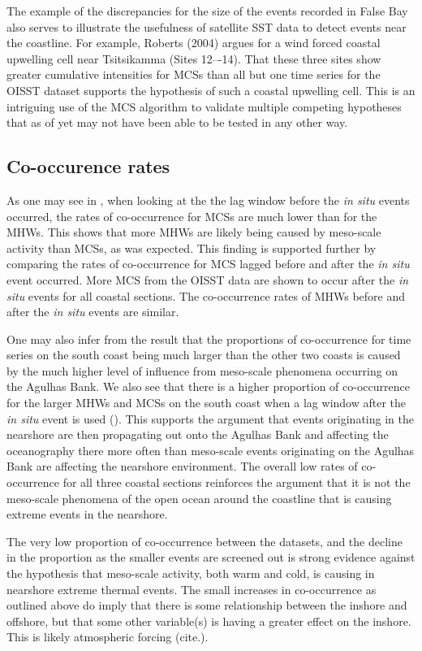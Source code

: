 \documentclass[a4paper,10pt,review]{elsarticle}
\begin{document}
The example of the discrepancies for the size of the events recorded in False Bay also serves to illustrate the usefulness of satellite SST data to detect events near the coastline. For example, Roberts (2004) argues for a wind forced coastal upwelling cell near Tsitsikamma (Sites 12–-14). That these three sites show greater cumulative intensities for MCSs than all but one time series for the OISST dataset supports the hypothesis of such a coastal upwelling cell. This is an intriguing use of the MCS algorithm to validate multiple competing hypotheses that as of yet may not have been able to be tested in any other way. 

\subsection{Co-occurence rates}
As one may see in , when looking at the the lag window before the \emph{in situ} events occurred, the rates of co-occurrence for MCSs are much lower than for the MHWs. This shows that more MHWs are likely being caused by meso-scale activity than MCSs, as was expected. This finding is supported further by comparing the rates of co-occurrence for MCS lagged before and after the \emph{in situ} event occurred. More MCS from the OISST data are shown to occur after the \emph{in situ} events for all coastal sections. The co-occurrence rates of MHWs before and after the \emph{in situ} events are similar.

One may also infer from the result that the proportions of co-occurrence for time series on the south coast being much larger than the other two coasts is caused by the much higher level of influence from meso-scale phenomena occurring on the Agulhas Bank. We also see that there is a higher proportion of co-occurrence for the larger MHWs and MCSs on the south coast when a lag window after the \emph{in situ} event is used (). This supports the argument that events originating in the nearshore are then propagating out onto the Agulhas Bank and affecting the oceanography there more often than meso-scale events originating on the Agulhas Bank are affecting the nearshore environment. The overall low rates of co-occurrence for all three coastal sections reinforces the argument that it is not the meso-scale phenomena of the open ocean around the coastline that is causing extreme events in the nearshore.

The very low proportion of co-occurrence between the datasets, and the decline in the proportion as the smaller events are screened out is strong evidence against the hypothesis that meso-scale activity, both warm and cold, is causing in nearshore extreme thermal events. The small increases in co-occurrence as outlined above do imply that there is some relationship between the inshore and offshore, but that some other variable(s) is having a greater effect on the inshore. This is likely atmospheric forcing (cite.).
\end{document}
